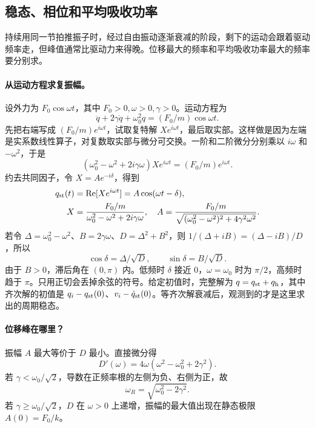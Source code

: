 \subsection{稳态、相位和平均吸收功率}
持续用同一节拍推振子时，经过自由振动逐渐衰减的阶段，剩下的运动会跟着驱动频率走，但峰值通常比驱动力来得晚。位移最大的频率和平均吸收功率最大的频率要分别求。

\paragraph{从运动方程求复振幅。}
设外力为 $F_0\cos\omega t$，其中 $F_0>0,\omega>0,\gamma>0$。运动方程为
\[
\ddot q+2\gamma\dot q+\omega_0^2q=(F_0/m)\cos\omega t .
\]
先把右端写成 $(F_0/m)e^{i\omega t}$，试取复特解 $Xe^{i\omega t}$，最后取实部。这样做是因为左端是实系数线性算子，对复数取实部与微分可交换。一阶和二阶微分分别乘以 $i\omega$ 和 $-\omega^2$，于是
\[
(\omega_0^2-\omega^2+2i\gamma\omega)Xe^{i\omega t}
=(F_0/m)e^{i\omega t}.
\]
约去共同因子，令 $X=Ae^{-i\delta}$，得到
\begin{align}
q_{\rm st}(t)&=\operatorname{Re}[Xe^{i\omega t}]=A\cos(\omega t-\delta),\\
X&=\frac{F_0/m}{\omega_0^2-\omega^2+2i\gamma\omega},\quad
A=\frac{F_0/m}{\sqrt{(\omega_0^2-\omega^2)^2+4\gamma^2\omega^2}}.
\label{eq:forced}
\end{align}
若令 $\Delta=\omega_0^2-\omega^2$、$B=2\gamma\omega$、$D=\Delta^2+B^2$，则 $1/(\Delta+iB)=(\Delta-iB)/D$，所以
\[
\cos\delta=\Delta/\sqrt D,\qquad \sin\delta=B/\sqrt D .
\]
由于 $B>0$，滞后角在 $(0,\pi)$ 内。低频时 $\delta$ 接近 $0$，$\omega=\omega_0$ 时为 $\pi/2$，高频时趋于 $\pi$。只用正切会丢掉余弦的符号。给定初值时，完整解为 $q=q_{\rm st}+q_{\rm h}$，其中齐次解的初值是 $q_i-q_{\rm st}(0)$、$v_i-\dot q_{\rm st}(0)$。等齐次解衰减后，观测到的才是这里求出的周期稳态。

\paragraph{位移峰在哪里？}
振幅 $A$ 最大等价于 $D$ 最小。直接微分得
\[
D'(\omega)=4\omega(\omega^2-\omega_0^2+2\gamma^2).
\]
若 $\gamma<\omega_0/\sqrt2$，导数在正频率根的左侧为负、右侧为正，故
\[
\omega_R=\sqrt{\omega_0^2-2\gamma^2}.
\]
若 $\gamma\ge\omega_0/\sqrt2$，$D$ 在 $\omega>0$ 上递增，振幅的最大值出现在静态极限 $A(0)=F_0/k$。

